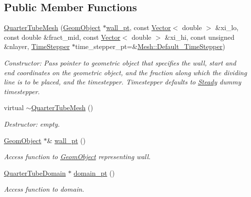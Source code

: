 \subsection*{Public Member Functions}
\begin{DoxyCompactItemize}
\item 
\hyperlink{classoomph_1_1QuarterTubeMesh_a4dfb9a85b3c07d8bafa0f916c445c18a}{Quarter\+Tube\+Mesh} (\hyperlink{classoomph_1_1GeomObject}{Geom\+Object} $\ast$\hyperlink{classoomph_1_1QuarterTubeMesh_af59c4cde343ddd76caea4bc8c8ad8b94}{wall\+\_\+pt}, const \hyperlink{classoomph_1_1Vector}{Vector}$<$ double $>$ \&xi\+\_\+lo, const double \&fract\+\_\+mid, const \hyperlink{classoomph_1_1Vector}{Vector}$<$ double $>$ \&xi\+\_\+hi, const unsigned \&nlayer, \hyperlink{classoomph_1_1TimeStepper}{Time\+Stepper} $\ast$time\+\_\+stepper\+\_\+pt=\&\hyperlink{classoomph_1_1Mesh_a12243d0fee2b1fcee729ee5a4777ea10}{Mesh\+::\+Default\+\_\+\+Time\+Stepper})
\begin{DoxyCompactList}\small\item\em Constructor\+: Pass pointer to geometric object that specifies the wall, start and end coordinates on the geometric object, and the fraction along which the dividing line is to be placed, and the timestepper. Timestepper defaults to \hyperlink{classoomph_1_1Steady}{Steady} dummy timestepper. \end{DoxyCompactList}\item 
virtual \hyperlink{classoomph_1_1QuarterTubeMesh_aeb6ec7337a9e1666ebc6c942e788bab7}{$\sim$\+Quarter\+Tube\+Mesh} ()
\begin{DoxyCompactList}\small\item\em Destructor\+: empty. \end{DoxyCompactList}\item 
\hyperlink{classoomph_1_1GeomObject}{Geom\+Object} $\ast$\& \hyperlink{classoomph_1_1QuarterTubeMesh_af59c4cde343ddd76caea4bc8c8ad8b94}{wall\+\_\+pt} ()
\begin{DoxyCompactList}\small\item\em Access function to \hyperlink{classoomph_1_1GeomObject}{Geom\+Object} representing wall. \end{DoxyCompactList}\item 
\hyperlink{classoomph_1_1QuarterTubeDomain}{Quarter\+Tube\+Domain} $\ast$ \hyperlink{classoomph_1_1QuarterTubeMesh_a5629c3a0d3f8a60165fb7024b851e3e3}{domain\+\_\+pt} ()
\begin{DoxyCompactList}\small\item\em Access function to domain. \end{DoxyCompactList}\item 

\end{DoxyCompactItemize}
